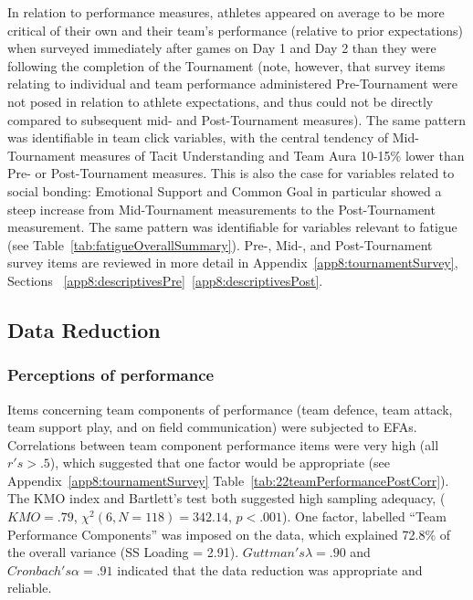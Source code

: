 \begin{CJK}{UTF8}{gbsn}
In relation to performance measures, athletes appeared on average to be more critical of their own and their team's performance (relative to prior expectations) when surveyed immediately after games on Day 1 and Day 2 than they were following the completion of the Tournament (note, however, that survey items relating to individual and team performance administered Pre-Tournament were not posed in relation to athlete expectations, and thus could not be directly compared to subsequent mid- and Post-Tournament measures).  The same pattern was identifiable in team click variables, with the central tendency of Mid-Tournament measures of Tacit Understanding and Team Aura 10-15\% lower than Pre- or Post-Tournament measures.  This is also the case for variables related to social bonding: Emotional Support and Common Goal in particular showed a steep increase from Mid-Tournament measurements to the Post-Tournament measurement.  The same pattern was identifiable for variables relevant to fatigue (see Table~\ref{tab:fatigueOverallSummary}).
Pre-, Mid-, and Post-Tournament survey items are reviewed in more detail in Appendix~\ref{app8:tournamentSurvey}, Sections ~\ref{app8:descriptivesPre}\nobreakdash~\ref{app8:descriptivesPost}.














\subsection{Data Reduction\label{Ch5:dataReduction}}


\subsubsection{Perceptions of performance}

Items concerning team components of performance (team defence, team attack, team support play, and on field communication) were subjected to EFAs.  Correlations between team component performance items were very high (all $r's > .5$), which suggested that one factor would be appropriate (see Appendix~\ref{app8:tournamentSurvey} Table~\ref{tab:22teamPerformancePostCorr}). The KMO index and Bartlett's test both suggested high sampling adequacy, ($KMO = .79$, $\chi^2(6, N = 118) = 342.14$, $p < .001$).  One factor, labelled ``Team Performance Components'' was imposed on the data, which explained 72.8\% of the overall variance (SS Loading = 2.91). $Guttman's \lambda =.90$ and $Cronbach's\alpha = .91$ indicated that the data reduction was appropriate and reliable.


\end{CJK}
